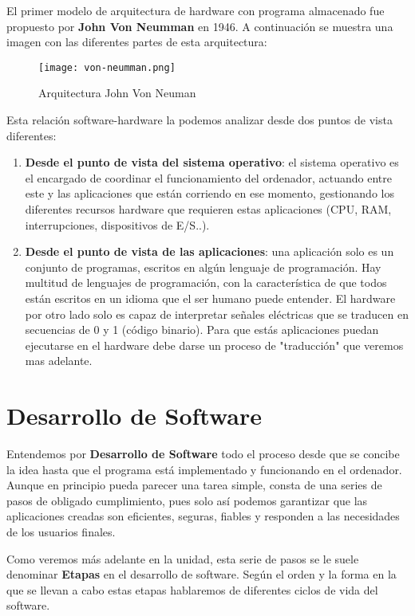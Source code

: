 El primer modelo de arquitectura de hardware con programa almacenado fue propuesto por {\bfseries John Von Neumman} en 1946. A continuación se muestra una imagen con las diferentes partes de esta arquitectura:

\begin{figure}[h]
    \centering
    \texttt{[image: von-neumman.png]}
    \caption{Arquitectura John Von Neuman}
\end{figure}

Esta relación software-hardware la podemos analizar desde dos puntos de vista diferentes:

\begin{enumerate}[label={\alph*}]
    \item {\bfseries Desde el punto de vista del sistema operativo}: el sistema operativo es el encargado de coordinar
    el funcionamiento del ordenador, actuando entre este y las aplicaciones que están corriendo en ese momento, gestionando los diferentes recursos hardware que requieren estas aplicaciones (CPU, RAM, interrupciones, dispositivos de E/S..).
    \item {\bfseries Desde el punto de vista de las aplicaciones}: una aplicación solo es un conjunto de programas, escritos en algún lenguaje de programación. Hay multitud de lenguajes de programación, con la característica de que todos están escritos en un idioma que el ser humano puede entender. El hardware por otro lado solo es capaz de interpretar señales eléctricas que se traducen en secuencias de 0 y 1 (código binario). Para que estás aplicaciones puedan ejecutarse en el hardware debe darse un proceso de "traducción" que veremos mas adelante.
\end{enumerate}

\section{Desarrollo de Software}
Entendemos por {\bfseries \gls{Desarrollo de Software}} todo el proceso desde que se concibe la idea hasta que el programa está implementado y funcionando en el ordenador. Aunque en principio pueda parecer una tarea simple, consta de una series de pasos de obligado cumplimiento, pues solo así podemos garantizar que las aplicaciones creadas son eficientes, seguras, fiables y responden a las necesidades de los usuarios finales.

Como veremos más adelante en la unidad, esta serie de pasos se le suele denominar {\bfseries Etapas} en el desarrollo de software. Según el orden y la forma en la que se llevan a cabo estas etapas hablaremos de diferentes ciclos de vida del software. \\

